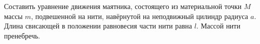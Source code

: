 Составить уравнение движения маятника,
состоящего из материальной точки $M$ массы $m$,
подвешенной на нити, навёрнутой на неподвижный цилиндр радиуса $a$.
Длина свисающей в положении равновесия части нити равна $l$.
Массой нити пренебречь.
